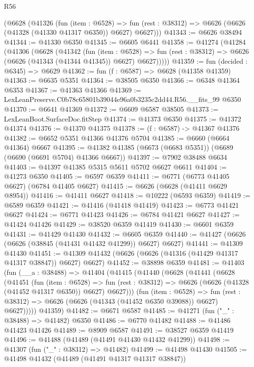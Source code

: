 \begin{lexlean}{R56}
\begin{coremodule}
    (@6628
      (@41326
        (fun (item : @6528) =>
        fun (rest : @38312) => @6626 (@6626 (@41328 (@41330 @41317 @6350)) @6627) @6627)))
@41343 := @6626 @38494
@41344 := @41330 @6350
@41345 := @6605 @6441
@41358 := @41274
    (@41284
      (@41306
        (@6628
          (@41342
            (fun (item : @6528) =>
            fun (rest : @38312) => @6626 (@6626 (@41343 (@41344 @41345)) @6627) @6627)))))
@41359 := fun (decided : @6345) => @6629
@41362 := fun (f : @6587) => @6628 (@41358 @41359)
@41363 := @6635 @5351
@41364 := @38505 @6350
@41366 := @6348 @41364 @6353
@41367 := @41363 @41366
@41369 := LexLeanPreserve.C0b78c65801b39044e96a0b3235c2dd44.R56.__fits_99 @6350
@41370 := @6641 @41369
@41372 := @6609 @6587 @38505
@41373 := LexLeanBoot.SurfaceDoc.fitStep
@41374 := @41373 @6350
@41375 := @41372 @41374
@41376 := @41370 @41375
@41378 := (f : @6587) -> @41367 @41376
@41382 := @6652 @5351 @41366 @41376 @5704
@41385 := @6660 (@6664 @41364) @6667
@41395 := @41382 @41385 (@6673 (@6683 @5351)) (@6689 (@6690 (@6691 @5704) @41366 @6667))
@41397 := @7902 @38488 @6634
@41403 := @41397 @41385 @5315 @5611 @5702 @6627 @6611
@41404 := @41273 @6350
@41405 := @6597 @6359
@41411 := @6771 (@6773 @41405 @6627) (@6784 @41405 @6627)
@41415 := @6626 (@6628 (@41411 @6629 @8954))
@41416 := @41411 @6627
@41418 := @10222 (@6593 @6359)
@41419 := @6589 @6359
@41421 := @41416 (@41418 @41419)
@41423 := @6773 @41421 @6627
@41424 := @6771 @41423
@41426 := @6784 @41421 @6627
@41427 := @41424 @41426
@41429 := @38520 @6359 @41419
@41430 := @6601 @6359
@41431 := @41429 @41430
@41432 := @6605 @6359
@41440 := @41427 (@6626 (@6626 (@38845 (@41431 @41432 @41299)) @6627) @6627)
@41441 := @41309 @41430
@41451 := @41309 @41432 (@6626 (@6626 (@41316 (@41429 @41317 @41317 @38847)) @6627) @6627)
@41452 := @38898 @6359
@41481 := @41403
    (fun (__a : @38488) =>
    @41404
      (@41415
        (@41440
          (@6628
            (@41441
              (@6628
                (@41451
                  (fun (item : @6528) =>
                  fun (rest : @38312) => @6626 (@6626 (@41328 (@41452 @41317 @6350)) @6627) @6627)))
              (fun (item : @6528) =>
              fun (rest : @38312) => @6626 (@6626 (@41343 (@41452 @6350 @39088)) @6627) @6627)))))
      @41359)
@41482 := @6671 @6587
@41485 := @41271 (fun ("_" : @38488) => @41482) @6350
@41486 := @6770 @41482
@41488 := @41486 @41423 @41426
@41489 := @8909 @6587
@41491 := @38527 @6359 @41419
@41496 := @41488 (@41489 (@41491 @41430 @41432 @41299))
@41498 := @41307 (fun ("_" : @38312) => @41482)
@41499 := @41498 @41430
@41505 := @41498 @41432 (@41489 (@41491 @41317 @41317 @38847))

\end{coremodule}
\end{lexlean}
